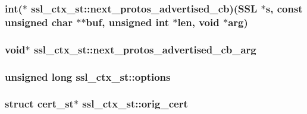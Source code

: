 \hypertarget{structssl__ctx__st_a296211f7df34cb6e2f06fe508390b1d1}{
\subsubsection[{next\-\_\-protos\-\_\-advertised\-\_\-cb}]{\setlength{\rightskip}{0pt plus 5cm}int($\ast$ ssl\-\_\-ctx\-\_\-st\-::next\-\_\-protos\-\_\-advertised\-\_\-cb)(S\-S\-L $\ast$s, const unsigned char $\ast$$\ast$buf, unsigned int $\ast$len, void $\ast$arg)}}\label{structssl__ctx__st_a296211f7df34cb6e2f06fe508390b1d1}
\hypertarget{structssl__ctx__st_ac8a1f0523b26a16a16af4776041850f6}{
\subsubsection[{next\-\_\-protos\-\_\-advertised\-\_\-cb\-\_\-arg}]{\setlength{\rightskip}{0pt plus 5cm}void$\ast$ ssl\-\_\-ctx\-\_\-st\-::next\-\_\-protos\-\_\-advertised\-\_\-cb\-\_\-arg}}\label{structssl__ctx__st_ac8a1f0523b26a16a16af4776041850f6}
\hypertarget{structssl__ctx__st_aeca7f42401b9a9465d47a206f155f6ba}{
\subsubsection[{options}]{\setlength{\rightskip}{0pt plus 5cm}unsigned long ssl\-\_\-ctx\-\_\-st\-::options}}\label{structssl__ctx__st_aeca7f42401b9a9465d47a206f155f6ba}
\hypertarget{structssl__ctx__st_acbcec05186fffb42fc0fd93d6a1b6fa3}{
\subsubsection[{orig\-\_\-cert}]{\setlength{\rightskip}{0pt plus 5cm}struct {\bf cert\-\_\-st}$\ast$ ssl\-\_\-ctx\-\_\-st\-::orig\-\_\-cert}}\label{structssl__ctx__st_acbcec05186fffb42fc0fd93d6a1b6fa3}
